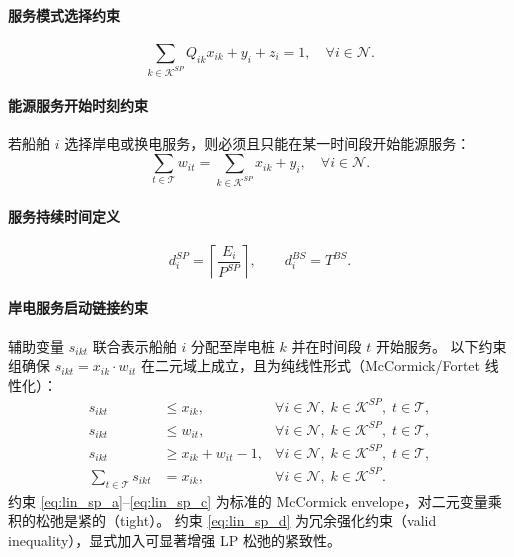 \documentclass[UTF8, a4paper, 12pt]{ctexart}
\begin{document}
\paragraph{服务模式选择约束}
\begin{equation}
\sum_{k \in \mathcal{K}^{SP}} Q_{ik} x_{ik} + y_i + z_i = 1,
\quad \forall i \in \mathcal{N}.
\label{eq:mode_24_final}
\end{equation}

\paragraph{能源服务开始时刻约束}
若船舶 $i$ 选择岸电或换电服务，则必须且只能在某一时间段开始能源服务：
\begin{equation}
\sum_{t \in \mathcal{T}} w_{it}
=
\sum_{k \in \mathcal{K}^{SP}} x_{ik} + y_i,
\quad \forall i \in \mathcal{N}.
\label{eq:w_unique_24}
\end{equation}

\paragraph{服务持续时间定义}
\begin{equation}
d_i^{SP} = \left\lceil \frac{E_i}{P^{SP}} \right\rceil, 
\qquad
d_i^{BS} = T^{BS}.
\label{eq:duration_24}
\end{equation}

\paragraph{岸电服务启动链接约束}
辅助变量 $s_{ikt}$ 联合表示船舶 $i$ 分配至岸电桩 $k$ 并在时间段 $t$ 开始服务。
以下约束组确保 $s_{ikt} = x_{ik} \cdot w_{it}$ 在二元域上成立，且为纯线性形式（McCormick/Fortet 线性化）：
\begin{align}
s_{ikt} &\le x_{ik},
  & \forall i \in \mathcal{N},\; k \in \mathcal{K}^{SP},\; t \in \mathcal{T},
  \label{eq:lin_sp_a} \\
s_{ikt} &\le w_{it},
  & \forall i \in \mathcal{N},\; k \in \mathcal{K}^{SP},\; t \in \mathcal{T},
  \label{eq:lin_sp_b} \\
s_{ikt} &\ge x_{ik} + w_{it} - 1,
  & \forall i \in \mathcal{N},\; k \in \mathcal{K}^{SP},\; t \in \mathcal{T},
  \label{eq:lin_sp_c} \\
\sum_{t \in \mathcal{T}} s_{ikt} &= x_{ik},
  & \forall i \in \mathcal{N},\; k \in \mathcal{K}^{SP}.
  \label{eq:lin_sp_d}
\end{align}
约束 \eqref{eq:lin_sp_a}--\eqref{eq:lin_sp_c} 为标准的 McCormick envelope，对二元变量乘积的松弛是紧的（tight）。
约束 \eqref{eq:lin_sp_d} 为冗余强化约束（valid inequality），显式加入可显著增强 LP 松弛的紧致性。
\end{document}
